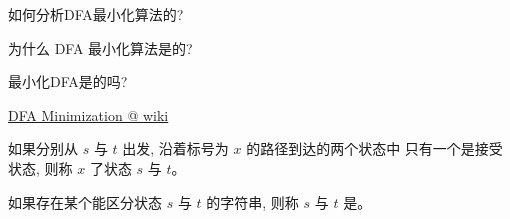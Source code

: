 \begin{frame}{}
  \begin{center}
    如何分析DFA最小化算法的?

    \pause
    \vspace{0.60cm}
    为什么 DFA 最小化算法是的?

    \pause
    \vspace{0.60cm}
    最小化DFA是的吗?

    \pause
    \vspace{0.80cm}
	\href{https://en.wikipedia.org/wiki/DFA_minimization}{DFA Minimization @ wiki}
  \end{center}
\end{frame}

\begin{frame}{}
  \begin{definition}
	如果分别从 $s$ 与 $t$ 出发, 沿着标号为 $x$ 的路径到达的两个状态中
	只有一个是接受状态, 则称 $x$ 了状态 $s$ 与 $t$。
  \end{definition}

  \pause
  \vspace{1.00cm}
  \begin{definition}
	如果存在某个能区分状态 $s$ 与 $t$ 的字符串,
	则称 $s$ 与 $t$ 是。
  \end{definition}
\end{frame}
